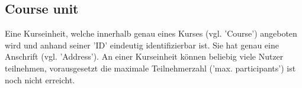 \subsection{Course unit}
Eine Kurseinheit, welche innerhalb genau eines Kurses (vgl. 'Course') angeboten wird und anhand seiner 'ID' eindeutig identifizierbar ist. Sie hat genau eine Anschrift (vgl. 'Address'). An einer Kurseinheit können beliebig viele Nutzer teilnehmen, vorausgesetzt die maximale Teilnehmerzahl ('max. participants') ist noch nicht erreicht. 
